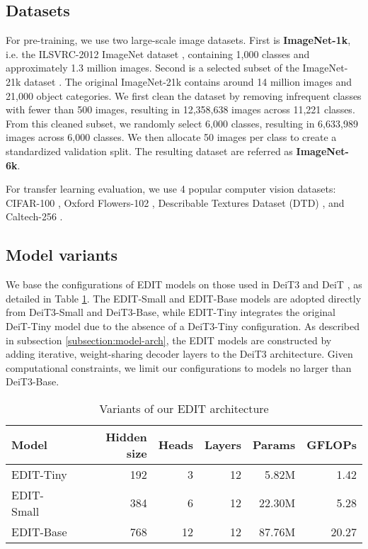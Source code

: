 \documentclass[anon,12pt]{colt2024} %
\begin{document}
\subsection{Datasets} \label{subsec:datasets}
For pre-training, we use two large-scale image datasets.
First is \textbf{ImageNet-1k}, i.e. the ILSVRC-2012 ImageNet dataset \cite{deng2009imagenet}, containing 1,000 classes and approximately 1.3 million images.
Second is a selected subset of the ImageNet-21k dataset \cite{ridnik2021imagenetk,deng2009imagenet}.
The original ImageNet-21k contains around 14 million images and 21,000 object categories. We first clean the dataset by removing infrequent classes with fewer than 500 images, resulting in 12,358,638 images across 11,221 classes. From this cleaned subset, we randomly select 6,000 classes, resulting in 6,633,989 images across 6,000 classes. We then allocate 50 images per class to create a standardized validation split. The resulting dataset are referred as \textbf{ImageNet-6k}.

For transfer learning evaluation, we use 4 popular computer vision datasets: CIFAR-100 \cite{krizhevsky2009learning}, Oxford Flowers-102 \cite{Nilsback08}, Describable Textures Dataset (DTD) \cite{cimpoi14describing}, and Caltech-256 \cite{griffin_holub_perona_2022}.

\subsection{Model variants}
We base the configurations of EDIT models on those used in DeiT3 \cite{touvron2022deit} and DeiT \cite{touvron2021training}, as detailed in Table \ref{tab:edit-variants}. The EDIT-Small and EDIT-Base models are adopted directly from DeiT3-Small and DeiT3-Base, while EDIT-Tiny integrates the original DeiT-Tiny model due to the absence of a DeiT3-Tiny configuration.
As described in subsection \ref{subsection:model-arch}, the EDIT models are constructed by adding iterative, weight-sharing decoder layers to the DeiT3 architecture. Given computational constraints, we limit our configurations to models no larger than DeiT3-Base.

\begin{table} [h!]
  \centering
  \begin{tabular}{l|rrrrr}
    \hline
    Model & Hidden size & Heads & Layers & Params & GFLOPs \\
    \hline
    EDIT-Tiny & 192 & 3 & 12 & 5.82M & 1.42 \\
    EDIT-Small & 384 & 6 & 12 & 22.30M & 5.28 \\
    EDIT-Base & 768 & 12 & 12 & 87.76M & 20.27 \\
    \hline
  \end{tabular}
  \caption{Variants of our EDIT architecture}
  \label{tab:edit-variants}
\end{table}
\end{document}
